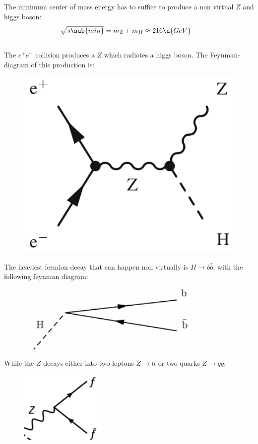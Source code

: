 \documentclass[exb]{exercise_5.0}
\begin{document}
\subsection{}
The minimum center of mass energy has to suffice to produce a non virtual $Z$ and higgs boson:
\begin{align*}
    \sqrt{s\sub{min}} &= m_Z + m_H \approx 216\u{GeV}
\end{align*}

\subsection{}
The $e^+e^-$ collision produces a $Z$ which radiates a higgs boson. The Feynman-diagram of this production is:
\begin{figure}[H]
    \centering
    \includegraphics[width=.4\textwidth]{Higgsstrahlung.png}
\end{figure}

The heaviest fermion decay that can happen non virtually is $H \to b \bar b$, with the following feynman diagram:
\begin{figure}[H]
    \centering
    \includegraphics[width=.4\textwidth]{higgs2bottom.png}
\end{figure}

While the $Z$ decays either into two leptons $Z\to l\bar l$ or two quarks $Z\to q\bar q$:
\begin{figure}[H]
    \centering
    \includegraphics[width=.3\textwidth]{Z2fermion.png}
\end{figure}
\end{document}
